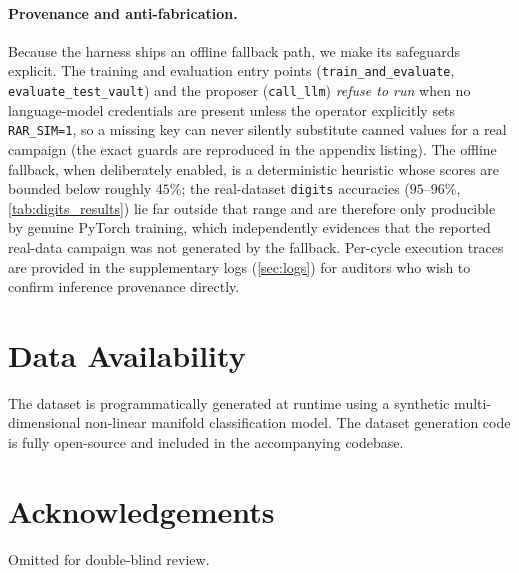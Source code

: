 \documentclass[conference]{IEEEtran}
\begin{document}
\paragraph{Provenance and anti-fabrication.} Because the harness ships an offline fallback path, we make its safeguards explicit. The training and evaluation entry points (\texttt{train\_and\_evaluate}, \texttt{evaluate\_test\_vault}) and the proposer (\texttt{call\_llm}) \emph{refuse to run} when no language-model credentials are present unless the operator explicitly sets \texttt{RAR\_SIM=1}, so a missing key can never silently substitute canned values for a real campaign (the exact guards are reproduced in the appendix listing). The offline fallback, when deliberately enabled, is a deterministic heuristic whose scores are bounded below roughly $45\%$; the real-dataset \texttt{digits} accuracies ($95$--$96\%$, \cref{tab:digits_results}) lie far outside that range and are therefore only producible by genuine PyTorch training, which independently evidences that the reported real-data campaign was not generated by the fallback. Per-cycle execution traces are provided in the supplementary logs (\cref{sec:logs}) for auditors who wish to confirm inference provenance directly.

\section*{Data Availability}
The dataset is programmatically generated at runtime using a synthetic multi-dimensional non-linear manifold classification model. The dataset generation code is fully open-source and included in the accompanying codebase.

\section*{Acknowledgements}
Omitted for double-blind review.
\end{document}
